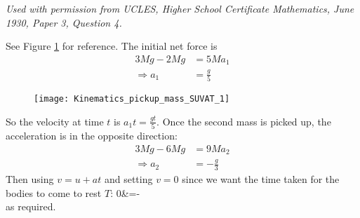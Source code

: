 

\begin{problem} %
 { }
{\textit{Used with permission from UCLES, Higher School Certificate Mathematics, June 1930, Paper 3, Question 4.}}
{See Figure \ref{fig:Kinematics_pickup_mass_SUVAT_1} for reference.
The initial net force is
\begin{align*}
3Mg-2Mg&=5Ma_1 \\
\Rightarrow a_1&=\frac{g}{5}
\end{align*}

\begin{figure}[h]
	\centering
	\texttt{[image: Kinematics\_pickup\_mass\_SUVAT\_1]}
	\caption{}
	\label{fig:Kinematics_pickup_mass_SUVAT_1}
\end{figure}

So the velocity at time $t$ is $a_1t=\frac{gt}{5}$. Once the second mass is picked up, the acceleration is in the opposite direction:
\begin{align*}
3Mg-6Mg&=9Ma_2 \\
\Rightarrow a_2&=-\frac{g}{3}
\end{align*}
Then using $v=u+at$ and setting $v=0$ since we want the time taken for the bodies to come to rest $T$:
0&=- \\
as required. 
}
\end{problem}